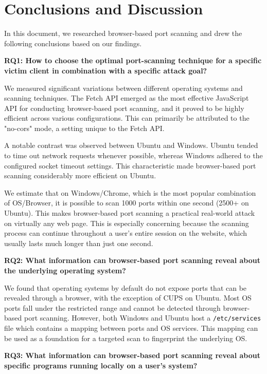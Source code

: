 \chapter{Conclusions and Discussion}

In this document, we researched browser-based port scanning and  drew the following conclusions based on our findings.

\textbf{RQ1: How to choose the optimal port-scanning technique for a specific victim client in combination with a specific attack goal?}

We measured significant variations between different operating systems and scanning techniques. The Fetch API emerged as the most effective JavaScript API for conducting browser-based port scanning, and it proved to be highly efficient across various configurations. This can primarily be attributed to the "no-cors" mode, a setting unique to the Fetch API.

A notable contrast was observed between Ubuntu and Windows. Ubuntu tended to time out network requests whenever possible, whereas Windows adhered to the configured socket timeout settings. This characteristic made browser-based port scanning considerably more efficient on Ubuntu.

We estimate that on Windows/Chrome, which is the most popular combination of OS/Browser, it is possible to scan 1000 ports within one second (2500+ on Ubuntu). This makes browser-based port scanning a practical real-world attack on virtually any web page. This is especially concerning because the scanning process can continue throughout a user's entire session on the website, which usually lasts much longer than just one second. 

\textbf{RQ2: What information can browser-based port scanning reveal about the underlying
operating system?}

We found that operating systems by default do not expose ports that can be revealed through a browser, with the exception of CUPS on Ubuntu. Most OS ports fall under the restricted range and cannot be detected through browser-based port scanning. However, both Windows and Ubuntu host a \texttt{/etc/services} file which contains a mapping between ports and OS services. This mapping can be used as a foundation for a targeted scan to fingerprint the underlying OS.

\textbf{RQ3: What information can browser-based port scanning reveal about specific programs
running locally on a user’s system?}

